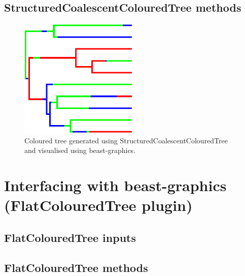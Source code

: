 \documentclass[a4paper,11pt]{paper}
\newcommand{\class}[1]{\textsf{#1}}
\newcommand{\project}[1]{\textsf{#1}}
\begin{document}
\subsection{StructuredCoalescentColouredTree methods}

\begin{figure}
	\centering
	\includegraphics[width=0.5\textwidth]{structuredCoalescentFig.pdf}
	\caption{Coloured tree generated using
		\class{StructuredCoalescentColouredTree} and visualised using
	\project{beast-graphics}.}
\end{figure}

\section{Interfacing with {\textsf beast-graphics} (FlatColouredTree plugin)}

\subsection{FlatColouredTree inputs}
\subsection{FlatColouredTree methods}
\end{document}
